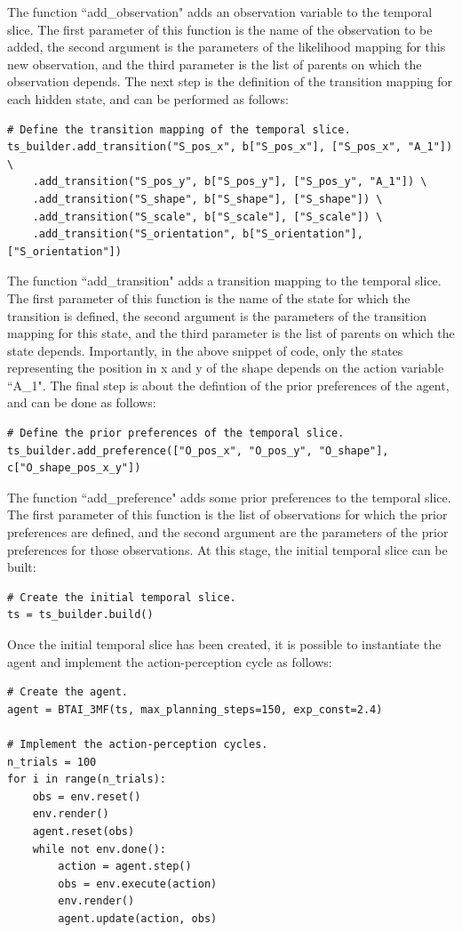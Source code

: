 \documentclass[twoside,11pt]{article}
\begin{document}
The function ``add\_observation" adds an observation variable to the temporal slice. The first parameter of this function is the name of the observation to be added, the second argument is the parameters of the likelihood mapping for this new observation, and the third parameter is the list of parents on which the observation depends. The next step is the definition of the transition mapping for each hidden state, and can be performed as follows:
\begin{verbatim}
# Define the transition mapping of the temporal slice.
ts_builder.add_transition("S_pos_x", b["S_pos_x"], ["S_pos_x", "A_1"]) \
    .add_transition("S_pos_y", b["S_pos_y"], ["S_pos_y", "A_1"]) \
    .add_transition("S_shape", b["S_shape"], ["S_shape"]) \
    .add_transition("S_scale", b["S_scale"], ["S_scale"]) \
    .add_transition("S_orientation", b["S_orientation"], ["S_orientation"])
\end{verbatim}
The function ``add\_transition" adds a transition mapping to the temporal slice. The first parameter of this function is the name of the state for which the transition is defined, the second argument is the parameters of the transition mapping for this state, and the third parameter is the list of parents on which the state depends. Importantly, in the above snippet of code, only the states representing the position in x and y of the shape depends on the action variable ``A\_1". The final step is about the defintion of the prior preferences of the agent, and can be done as follows:
\begin{verbatim}
# Define the prior preferences of the temporal slice.
ts_builder.add_preference(["O_pos_x", "O_pos_y", "O_shape"], c["O_shape_pos_x_y"])
\end{verbatim}
The function ``add\_preference" adds some prior preferences to the temporal slice. The first parameter of this function is the list of observations for which the prior preferences are defined, and the second argument are the parameters of the prior preferences for those observations. At this stage, the initial temporal slice can be built:
\begin{verbatim}
# Create the initial temporal slice.
ts = ts_builder.build()
\end{verbatim}
Once the initial temporal slice has been created, it is possible to instantiate the agent and implement the action-perception cycle as follows: 
\begin{verbatim}
# Create the agent.
agent = BTAI_3MF(ts, max_planning_steps=150, exp_const=2.4)

# Implement the action-perception cycles.
n_trials = 100
for i in range(n_trials):
    obs = env.reset()
    env.render()
    agent.reset(obs)
    while not env.done():
        action = agent.step()
        obs = env.execute(action)
        env.render()
        agent.update(action, obs)
\end{verbatim}
\end{document}
